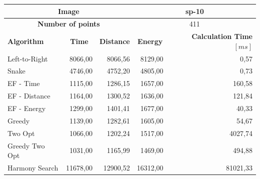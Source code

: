 \documentclass[titlepage]{article}
\begin{document}
\begin{table}[H]
	\begin{center}
		\begin{tabular}{|m{4cm}||r|r|r|r|}
			\hline
			
			\multicolumn{3}{|c|}{ 			\cellcolor[gray]{0.7} \textbf{Image}} & \multicolumn{2}{|c|}{sp-10} \\ \hline
			\multicolumn{3}{|c|}{ \cellcolor[gray]{0.7} \textbf{Number of points}} & \multicolumn{2}{|c|}{411} \\ \hline \hline
			
			\rowcolor{gray!30}
			
			\textbf{Algorithm} & \multicolumn{1}{|c|}{\textbf{Time}} & \multicolumn{1}{|c|}{\textbf{Distance}} & \multicolumn{1}{|c|}{\textbf{Energy}} & \multicolumn{1}{|p{2.5cm}|}{\textbf{Calculation Time $[ms]$}} \\ \hline
			
			Left-to-Right	 & 8066,00	& 8066,56& 	8129,00	& 0,57
			
			\\ \cline{2-5}
			
			Snake & 4746,00	& 4752,20& 	4805,00	& 0,73
			
			\\ \cline{2-5}
			
			EF - Time & 1115,00	& 1286,15	& 1657,00	& 160,58
			
			\\ \cline{2-5}
			
			EF - Distance & 1164,00	& 1300,52	& 1636,00& 	121,84
			
			\\ \cline{2-5}
			
			EF - Energy & 1299,00	& 1401,41	& 1677,00& 	40,33
			
			\\ \cline{2-5}
			
			Greedy & 1139,00& 	1282,61	& 1605,00& 	54,67
			
			\\ \cline{2-5}
			
			Two Opt & 1066,00	& 1202,24	& 1517,00& 	4027,74
			
			\\ \cline{2-5}
			
			Greedy Two Opt & 1031,00& 	\cellcolor{yellow!50}1165,99	& 1469,00& 	494,88
			
			\\ \cline{2-5}
			
			Harmony Search & 11678,00	& 12900,52& 	16312,00	& 81021,33
			

\end{tabular}
\end{center}
\end{table}
\end{document}
